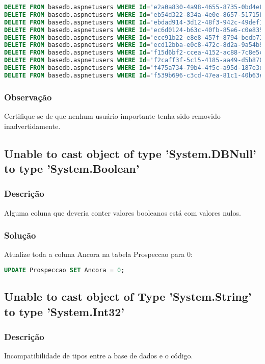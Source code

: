 \documentclass[12pt]{article}
\begin{document}
\begin{lstlisting}[language=SQL]
DELETE FROM basedb.aspnetusers WHERE Id='e2a0a830-4a98-4655-8735-0bd4e8264622';
DELETE FROM basedb.aspnetusers WHERE Id='eb54d322-834a-4e0e-8657-51715bd41ecb';
DELETE FROM basedb.aspnetusers WHERE Id='ebdad914-3d12-48f3-942c-49def121dcd7';
DELETE FROM basedb.aspnetusers WHERE Id='ec6d0124-b63c-40fb-85e6-c0e83518ac4e';
DELETE FROM basedb.aspnetusers WHERE Id='ecc91b22-e8e8-457f-8794-bedb713b5d01';
DELETE FROM basedb.aspnetusers WHERE Id='ecd12bba-e0c8-472c-8d2a-9a54b9a40873';
DELETE FROM basedb.aspnetusers WHERE Id='f15d6bf2-ccea-4152-ac88-7c8e5c191f1f';
DELETE FROM basedb.aspnetusers WHERE Id='f2caff3f-5c15-4185-aa49-d5b870b17b80';
DELETE FROM basedb.aspnetusers WHERE Id='f475a734-79b4-4f5c-a95d-187e3d4cb3e9';
DELETE FROM basedb.aspnetusers WHERE Id='f539b696-c3cd-47ea-81c1-40b63e6f7435';
\end{lstlisting}

\subsubsection{Observação}
Certifique-se de que nenhum usuário importante tenha sido removido inadvertidamente.

\subsection{Unable to cast object of type 'System.DBNull' to type 'System.Boolean'}
\subsubsection{Descrição}
Alguma coluna que deveria conter valores booleanos está com valores nulos.

\subsubsection{Solução}
Atualize toda a coluna Ancora na tabela Prospeccao para 0:
\begin{lstlisting}[language=SQL]
UPDATE Prospeccao SET Ancora = 0;
\end{lstlisting}

\subsection{Unable to cast object of Type 'System.String' to type 'System.Int32'}
\subsubsection{Descrição}
Incompatibilidade de tipos entre a base de dados e o código.
\end{document}
